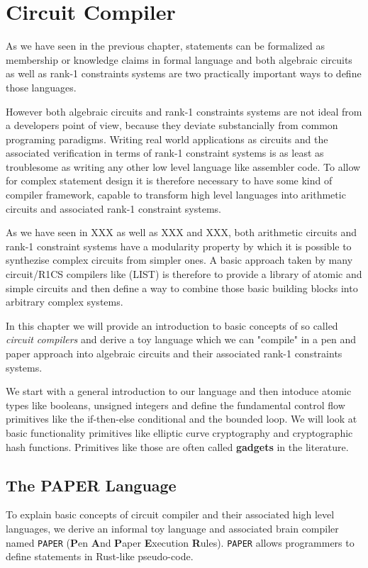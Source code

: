 \chapter{Circuit Compiler} 
As we have seen in the previous chapter, statements can be formalized as membership or knowledge claims in formal language and both algebraic circuits as well as rank-1 constraints systems are two practically important ways to define those languages.

However both algebraic circuits and rank-1 constraints systems are not ideal from a developers point of view, because they deviate substancially from common programing paradigms. Writing real world applications as circuits and the associated verification in terms of rank-1 constraint systems is as least as troublesome as writing any other low level language like assembler code. To allow for complex statement design it is therefore necessary to have some kind of compiler framework, capable to transform high level languages into arithmetic circuits and associated rank-1 constraint systems. 

As we have seen in XXX as well as XXX and XXX, both arithmetic circuits and rank-1 constraint systems have a modularity property by which it is possible to synthezise complex circuits from simpler ones. A basic approach taken by many circuit/R1CS compilers like (LIST) is therefore to provide a library of atomic and simple circuits and then define a way to combine those basic building blocks into arbitrary complex systems.

In this chapter we will provide an introduction to basic concepts of so called \textit{circuit compilers} and derive a toy language which we can "compile" in a pen and paper approach into algebraic circuits and their associated rank-1 constraints systems.

We start with a general introduction to our language and then intoduce atomic types like booleans, unsigned integers and define the fundamental control flow primitives like the if-then-else conditional and the bounded loop. We will look at basic functionality primitives like elliptic curve cryptography and cryptographic hash functions. Primitives like those are often called \textbf{gadgets} in the literature. 
\section{The PAPER Language} To explain basic concepts of circuit compiler and their associated high level languages, we derive an informal toy language and associated brain compiler named \texttt{PAPER} (\textbf{P}en \textbf{A}nd \textbf{P}aper \textbf{E}xecution \textbf{R}ules). \texttt{PAPER} allows programmers to define statements in Rust-like pseudo-code. 


